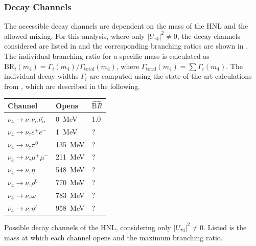 

\subsubsection{Decay Channels} 

The accessible decay channels are dependent on the mass of the HNL and the allowed mixing. For this analysis, where only $|U_{\tau4}|^2 \neq 0$, the decay channels considered are listed in  and the corresponding branching ratios are shown in . The individual branching ratio for a specific mass is calculated as $\mathrm{BR}_i(m_4)=\Gamma_i(m_4)/\Gamma_\mathrm{total}(m_4)$, where $\Gamma_\mathrm{total}(m_4)=\sum\Gamma_i(m_4)$.
The individual decay widths $\Gamma_i$ are computed using the state-of-the-art calculations from , which are described in the following.

\begin{margintable}
    \footnotesize
    \begin{tabular} { lll }
        \hline\hline 
        \textbf{Channel} & \textbf{Opens} & \textbf{$\hat{\mathrm BR}$} \\
        \hline\hline 
        $\nu_4 \rightarrow \nu_\tau \nu_\alpha \bar{\nu_\alpha}$ & \SI{0}{\MeV} & 1.0 \\
        $\nu_4 \rightarrow \nu_\tau e^+ e^-$ & \SI{1}{\MeV} & ? \\
        $\nu_4 \rightarrow \nu_\tau \pi^0$ & \SI{135}{\MeV} & ? \\
        $\nu_4 \rightarrow \nu_\tau \mu^+ \mu^-$ & \SI{211}{\MeV} & ? \\
        $\nu_4 \rightarrow \nu_\tau \eta$ & \SI{548}{\MeV} & ? \\
        $\nu_4 \rightarrow \nu_\tau \rho^0$ & \SI{770}{\MeV} & ? \\
        $\nu_4 \rightarrow \nu_\tau \omega$ & \SI{783}{\MeV} & ? \\
        $\nu_4 \rightarrow \nu_\tau \eta'$ & \SI{958}{\MeV} & ? \\
        \hline
    \end{tabular}
    \caption[HNL mass dependent decay channels]{Possible decay channels of the HNL, considering only $|U_{\tau4}|^2 \neq 0$. Listed is the mass at which each channel opens and the maximum branching ratio.}
\end{margintable}


